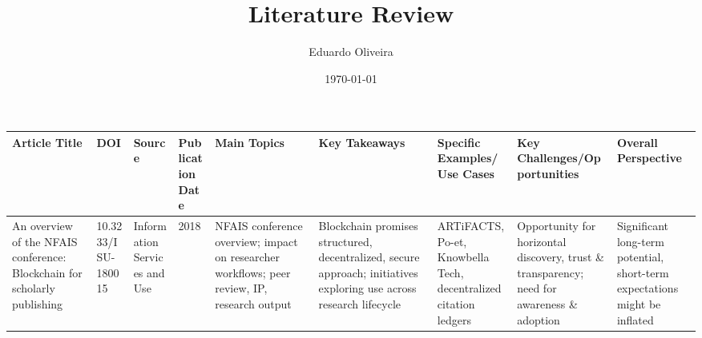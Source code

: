 \documentclass{article}
\title{Literature Review}
\author{Eduardo Oliveira}
\date{\today}
\begin{document}
\maketitle

\listoftodos


\begin{landscape}

    \renewcommand{\arraystretch}{1.4}
    \begin{tabularx}{\linewidth}{|p{3.5cm}|p{2.5cm}|p{3cm}|p{1.8cm}|X|X|X|X|X|}
        \hline
        \textbf{Article Title}                                                                                                             & \textbf{DOI}                    & \textbf{Source}                                                               & \textbf{Publication Date} & \textbf{Main Topics}                                                                                                        & \textbf{Key Takeaways}                                                                                                                         & \textbf{Specific Examples/Use Cases}                                                                    & \textbf{Key Challenges/Opportunities}                                                                                               & \textbf{Overall Perspective}                                                                          \\
        \hline

        An overview of the NFAIS conference: Blockchain for scholarly publishing                                                           & 10.3233/ISU-180015              & Information Services and Use                                                  & 2018                      & NFAIS conference overview; impact on researcher workflows; peer review, IP, research output                                 & Blockchain promises structured, decentralized, secure approach; initiatives exploring use across research lifecycle                            & ARTiFACTS, Po-et, Knowbella Tech, decentralized citation ledgers                                        & Opportunity for horizontal discovery, trust \& transparency; need for awareness \& adoption                                         & Significant long-term potential, short-term expectations might be inflated                            \\
        \hline


\end{tabularx}
\end{landscape}
\end{document}
